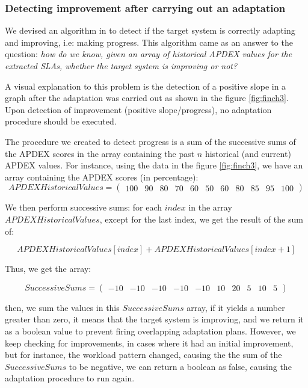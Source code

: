 \begin{appendices}
\subsubsection{Detecting improvement after carrying out an adaptation}

We devised an algorithm in \projectname{} to detect if the target system is correctly adapting and improving, i.e: making progress. This algorithm came as an answer to the question: \emph{how do we know, given an array of historical APDEX values for the extracted SLAs, whether the target system is improving or not?}

A visual explanation to this problem is the detection of a positive slope in a graph after the adaptation was carried out as shown in the figure \ref{fig:finch3}. Upon detection of improvement (positive slope/progress), no adaptation procedure should be executed. 

The procedure we created to detect progress is a sum of the successive sums of the APDEX scores in the array containing the past $n$ historical (and current) APDEX values. For instance, using the data in the figure \ref{fig:finch3}, we have an array containing the APDEX scores (in percentage):
\[
APDEXHistoricalValues = 
  \begin{pmatrix}100 & 90 & 80 & 70 & 60 & 50 & 60 & 80 & 85 & 95 & 100\end{pmatrix}
\]

We then perform successive sums: for each $index$ in the array $APDEXHistoricalValues$, except for the last index, we get the result of the sum of:

$$
APDEXHistoricalValues[index] + APDEXHistoricalValues[index + 1]
$$

Thus, we get the array:

\[
SuccessiveSums = 
  \begin{pmatrix}-10 & -10 & -10 & -10 & -10 & 10 & 20 & 5 & 10 & 5\end{pmatrix}
\]

then, we sum the values in this $SuccessiveSums$ array, if it yields a number greater than zero, it means that the target system is improving, and we return it as a boolean value to prevent firing overlapping adaptation plans. However, we keep checking for improvements, in cases where it had an initial improvement, but for instance, the workload pattern changed, causing the the sum of the $SuccessiveSums$ to be negative, we can return a boolean as false, causing the adaptation procedure to run again.


\end{appendices}
